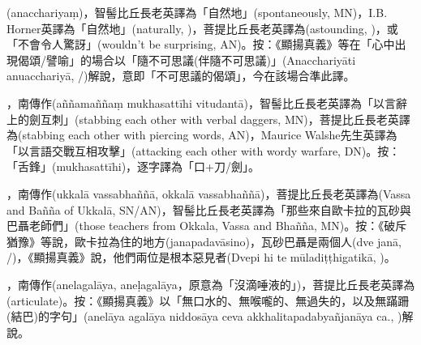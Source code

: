 \startitemgroup[noteitems]
\item{}(anacchariyaṃ)，智髻比丘長老英譯為「自然地」(spontaneously, MN)，I.B. Horner英譯為「自然地」(naturally, )，菩提比丘長老英譯為(astounding, )，或「不會令人驚訝」(wouldn't be surprising, AN)。按：《顯揚真義》等在「心中出現偈頌/譬喻」的場合以「隨不可思議(伴隨不可思議)」(Anacchariyāti anuacchariyā, /)解說，意即「不可思議的偈頌」，今在該場合準此譯。
\stopitemgroup

\startitemgroup[noteitems]
\item{}，南傳作(aññamaññaṃ mukhasattīhi vitudantā)，智髻比丘長老英譯為「以言辭上的劍互刺」(stabbing each other with verbal daggers, MN)，菩提比丘長老英譯為(stabbing each other with piercing words, AN)，Maurice Walshe先生英譯為「以言語交戰互相攻擊」(attacking each other with wordy warfare, DN)。按：「舌鋒」(mukhasattīhi)，逐字譯為「口+刀/劍」。
\stopitemgroup

\startitemgroup[noteitems]
\item{}，南傳作(ukkalā vassabhaññā, okkalā vassabhaññā)，菩提比丘長老英譯為(Vassa and Bañña of Ukkalā, SN/AN)，智髻比丘長老英譯為「那些來自歐卡拉的瓦砂與巴聶老師們」(those teachers from Okkala, Vassa and Bhañña, MN)。按：《破斥猶豫》等說，歐卡拉為住的地方(janapadavāsino)，瓦砂巴聶是兩個人(dve janā, /)，《顯揚真義》說，他們兩位是根本惡見者(Dvepi hi te mūladiṭṭhigatikā, )。
\stopitemgroup

\startitemgroup[noteitems]
\item{}，南傳作(anelagalāya, aneḷagalāya，原意為「沒滴唾液的」)，菩提比丘長老英譯為(articulate)。按：《顯揚真義》以「無口水的、無喉嚨的、無過失的，以及無蹣跚(結巴)的字句」(anelāya agalāya niddosāya ceva akkhalitapadabyañjanāya ca., )解說。
\stopitemgroup

